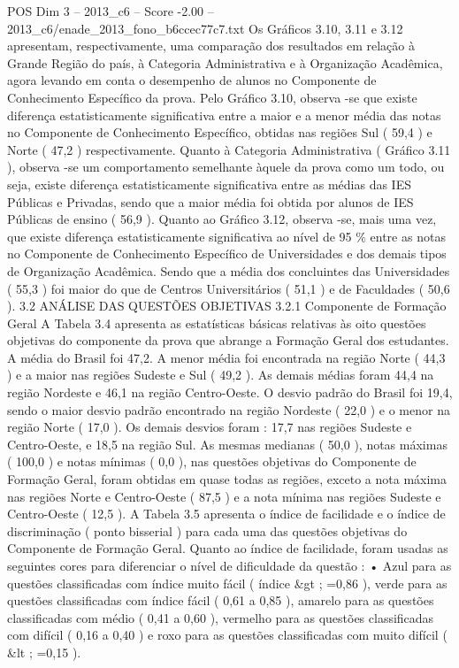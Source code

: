 \begin{textsample}{POS Dim 3 – 2013\_c6 – Score -2.00 – 2013\_c6/enade\_2013\_fono\_b6ccec77c7.txt}
Os Gráficos 3.10, 3.11 e 3.12 apresentam, respectivamente, uma comparação dos resultados em relação à Grande Região do país, à Categoria Administrativa e à Organização Acadêmica, agora levando em conta o desempenho de alunos no Componente de Conhecimento Específico da prova.
Pelo Gráfico 3.10, observa -se que existe diferença estatisticamente significativa entre a maior e a menor média das notas no Componente de Conhecimento Específico, obtidas nas regiões Sul ( 59,4 ) e Norte ( 47,2 ) respectivamente.
Quanto à Categoria Administrativa ( Gráfico 3.11 ), observa -se um comportamento semelhante àquele da prova como um todo, ou seja, existe diferença estatisticamente significativa entre as médias das IES Públicas e Privadas, sendo que a maior média foi obtida por alunos de IES Públicas de ensino ( 56,9 ).
Quanto ao Gráfico 3.12, observa -se, mais uma vez, que existe diferença estatisticamente significativa ao nível de 95 \% entre as notas no Componente de Conhecimento Específico de Universidades e dos demais tipos de Organização Acadêmica.
Sendo que a média dos concluintes das Universidades ( 55,3 ) foi maior do que de Centros Universitários ( 51,1 ) e de Faculdades ( 50,6 ). 3.2 ANÁLISE DAS QUESTÕES OBJETIVAS 3.2.1 Componente de Formação Geral A Tabela 3.4 apresenta as estatísticas básicas relativas às oito questões objetivas do componente da prova que abrange a Formação Geral dos estudantes.
A média do Brasil foi 47,2.
A menor média foi encontrada na região Norte ( 44,3 ) e a maior nas regiões Sudeste e Sul ( 49,2 ).
As demais médias foram 44,4 na região Nordeste e 46,1 na região Centro-Oeste.
O desvio padrão do Brasil foi 19,4, sendo o maior desvio padrão encontrado na região Nordeste ( 22,0 ) e o menor na região Norte ( 17,0 ).
Os demais desvios foram : 17,7 nas regiões Sudeste e Centro-Oeste, e 18,5 na região Sul.
As mesmas medianas ( 50,0 ), notas máximas ( 100,0 ) e notas mínimas ( 0,0 ), nas questões objetivas do Componente de Formação Geral, foram obtidas em quase todas as regiões, exceto a nota máxima nas regiões Norte e Centro-Oeste ( 87,5 ) e a nota mínima nas regiões Sudeste e Centro-Oeste ( 12,5 ).
A Tabela 3.5 apresenta o índice de facilidade e o índice de discriminação ( ponto bisserial ) para cada uma das questões objetivas do Componente de Formação Geral.
Quanto ao índice de facilidade, foram usadas as seguintes cores para diferenciar o nível de dificuldade da questão : • Azul para as questões classificadas com índice muito fácil ( índice \&gt ; =0,86 ), verde para as questões classificadas com índice fácil ( 0,61 a 0,85 ), amarelo para as questões classificadas com médio ( 0,41 a 0,60 ), vermelho para as questões classificadas com difícil ( 0,16 a 0,40 ) e roxo para as questões classificadas com muito difícil ( \&lt ; =0,15 ).

\end{textsample}
